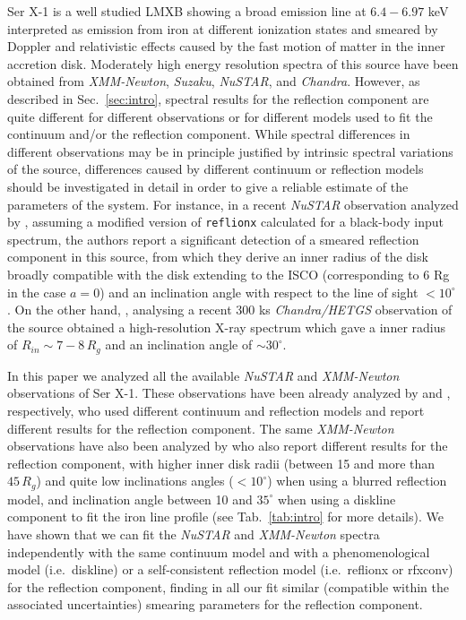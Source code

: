 \documentclass{aa}
\begin{document}
Ser X-1 is a well studied LMXB showing a broad emission line at $6.4 - 6.97$
keV interpreted as emission from iron at different ionization states and
smeared by Doppler and relativistic effects caused by the fast motion of
matter in the inner accretion disk. Moderately high energy resolution spectra 
of this source have been obtained from \emph{XMM-Newton}, \emph{Suzaku}, 
\emph{NuSTAR}, and \emph{Chandra}. 
However, as described in Sec.\ \ref{sec:intro}, spectral
results for the reflection component are quite different for different 
observations or for different models used to fit the continuum and/or the
reflection component. While spectral differences in different observations
may be in principle justified by intrinsic spectral variations of the source,
differences caused by different continuum or reflection models should be
investigated in detail in order to give a reliable estimate of the parameters
of the system. For instance, in a recent \emph{NuSTAR} observation
analyzed by \citet{Miller.etal:13}, assuming a modified version of 
\texttt{reflionx} calculated for a black-body input spectrum, the authors 
report a significant detection of a smeared reflection component in this source, 
from which they derive an inner radius of the disk broadly compatible with the 
disk extending to the ISCO (corresponding to 6 Rg in the case $a = 0$) and 
an inclination angle with respect to the line of sight $< 10^\circ$. 
On the other hand, \cite{Chiang.etal:16},   %
analysing a recent 300 ks \emph{Chandra/HETGS} observation of the source 
obtained a high-resolution X-ray spectrum which gave a inner radius of 
$R_{in} \sim 7-8 \, R_g$ and an inclination angle of $\sim 30^\circ$.

In this paper we analyzed all the available \emph{NuSTAR} and 
\emph{XMM-Newton} observations of Ser X-1. These observations have been already 
analyzed by \citet{Miller.etal:13} and \citet{Bhatta.etal:07}, respectively,
who used different continuum and reflection models and report different 
results for the reflection component. The same \emph{XMM-Newton} observations
have also been analyzed by \cite{Cackett.etal:10} who also report different
results for the reflection component, with higher inner disk radii (between
15 and more than $45\, R_g$) and quite low inclinations angles ($<10^\circ$)
when using a blurred reflection model, and inclination angle between 10 and
$35^\circ$ when using a diskline component to fit the iron line profile
(see Tab.\ \ref{tab:intro} for more details).
We have shown that we can fit the \emph{NuSTAR} and \emph{XMM-Newton} spectra
independently with the same continuum model and with a phenomenological model
(i.e.\ diskline) or a self-consistent reflection model (i.e.\ reflionx or 
rfxconv) for the reflection component, finding in all our fit similar 
(compatible within the associated uncertainties) smearing parameters for 
the reflection component.
\end{document}
